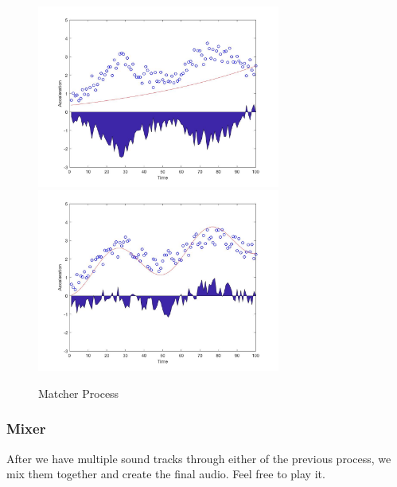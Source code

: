 \begin{figure}[htbp]
\centering
\newcommand{\widthOfMatcherFigure}{8cm}
\includegraphics[width=\widthOfMatcherFigure]{figWR/matcher1}
\includegraphics[width=\widthOfMatcherFigure]{figWR/matcher2}
\caption{Matcher Process}
\label{matcherStep}
\end{figure}

\subsubsection{Mixer}

   After we have multiple sound tracks through either of the previous process,
   we mix them together and create the final audio. Feel free to play it.

